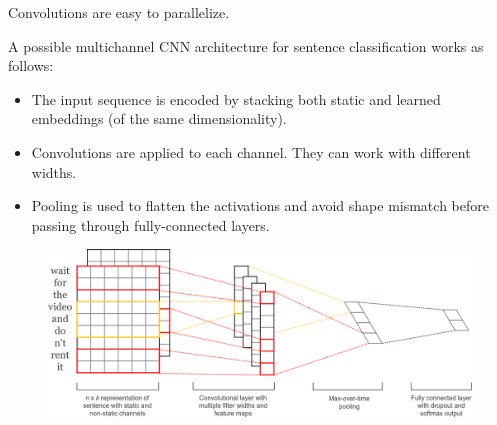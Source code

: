 \begin{remark}
    Convolutions are easy to parallelize.
\end{remark}

\begin{example}
    A possible multichannel CNN architecture for sentence classification works as follows:
    \begin{itemize}
        \item The input sequence is encoded by stacking both static and learned embeddings (of the same dimensionality).
        \item Convolutions are applied to each channel. They can work with different widths.
        \item Pooling is used to flatten the activations and avoid shape mismatch before passing through fully-connected layers.
    \end{itemize}

    \begin{figure}[H]
        \centering
        \includegraphics[width=0.7\linewidth]{./img/cnn_sentence_classification.png}
    \end{figure}
\end{example}

